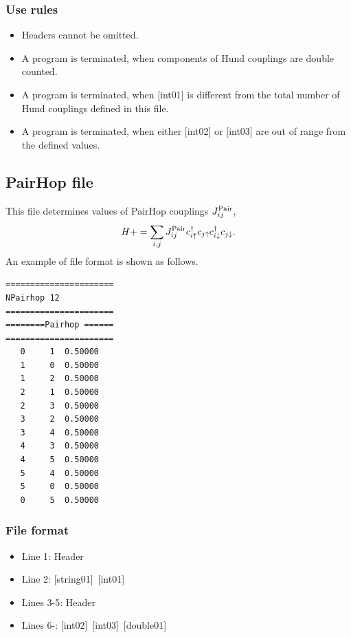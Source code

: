 \subsubsection{Use rules}
\begin{itemize}
\item Headers cannot be omitted. 
\item A program is terminated, when components of Hund couplings are double counted.
\item A program is terminated, when $[$int01$]$ is different from the total number of Hund couplings defined in this file.
\item A program is terminated, when either $[$int02$]$ or $[$int03$]$ are out of range from the defined values.
\end{itemize}

\newpage
\subsection{PairHop file}
This file determines values of PairHop couplings $J_{ij}^{\rm Pair}$,
\begin{equation}
H+=\sum_{i,j}J_{ij}^{\rm Pair} c_ {i \uparrow}^{\dag}c_{j\uparrow}c_{i \downarrow}^{\dag}c_{j  \downarrow}.
\end{equation}
An example of file format is shown as follows.

\begin{minipage}{12.5cm}
\begin{screen}
\begin{verbatim}
====================== 
NPairhop 12  
====================== 
========Pairhop ====== 
====================== 
   0     1  0.50000
   1     0  0.50000  
   1     2  0.50000
   2     1  0.50000
   2     3  0.50000
   3     2  0.50000
   3     4  0.50000
   4     3  0.50000
   4     5  0.50000
   5     4  0.50000
   5     0  0.50000
   0     5  0.50000
\end{verbatim}
\end{screen}
\end{minipage}

\subsubsection{File format}
 \begin{itemize}
   \item  Line 1:  Header
   \item  Line 2:   [string01]~[int01]
   \item  Lines 3-5:  Header
   \item  Lines 6-: 
   [int02]~[int03]~[double01] 
  \end{itemize}
